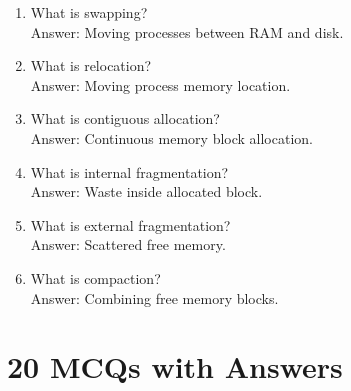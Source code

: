 \begin{enumerate}
\item What is swapping?\\
Answer: Moving processes between RAM and disk.

\item What is relocation?\\
Answer: Moving process memory location.

\item What is contiguous allocation?\\
Answer: Continuous memory block allocation.

\item What is internal fragmentation?\\
Answer: Waste inside allocated block.

\item What is external fragmentation?\\
Answer: Scattered free memory.

\item What is compaction?\\
Answer: Combining free memory blocks.
\end{enumerate}

\section{20 MCQs with Answers}

